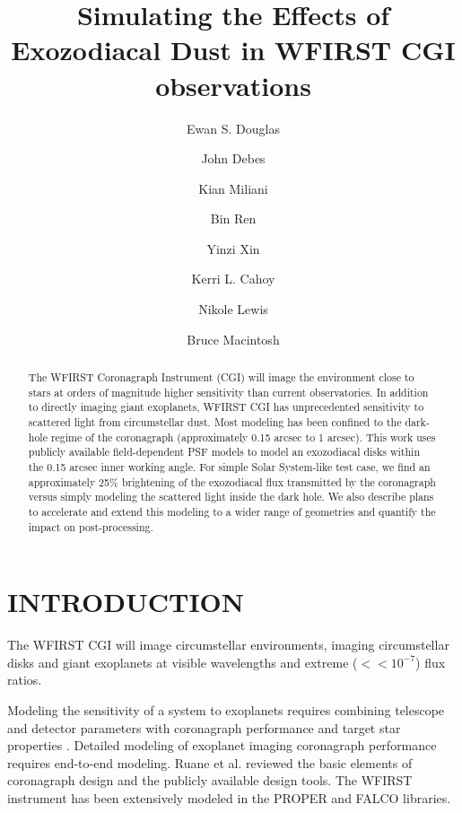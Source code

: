 \documentclass[]{spie}  %
\title{Simulating the Effects of Exozodiacal Dust in WFIRST CGI observations}
\author[a]{Ewan S. Douglas}
\author[b]{John Debes}
\author[a]{Kian Miliani}
\author[b]{Bin Ren}
\author[c]{Yinzi Xin}
\author[c]{Kerri L. Cahoy}
\author[d]{Nikole Lewis}
\author[e]{Bruce Macintosh}
\affil[a]{University of Arizona, Tucson, AZ, USA}
\affil[b]{STScI, Baltimore, MD, USA}
\affil[c]{MIT, Cambridge, MA, USA}
\affil[d]{Cornell University,Ithaca, NY , USA}
\affil[e]{Stanford University, Palo Alto, CA, USA}
\begin{document}
 
\maketitle

\begin{abstract}
The WFIRST Coronagraph Instrument (CGI) will image the environment close to stars at orders of magnitude higher sensitivity than current observatories. In addition to directly imaging giant exoplanets,  WFIRST CGI has unprecedented sensitivity to scattered light from circumstellar dust.
Most modeling has been confined to the dark-hole regime of the coronagraph (approximately 0.15 arcsec to  1 arcsec).
This work uses publicly available field-dependent PSF models to model an exozodiacal disks within the 0.15 arcsec inner working angle. For simple Solar System-like test case, we find an approximately 25\% brightening of the exozodiacal flux transmitted by the coronagraph versus simply modeling the scattered light inside the dark hole. We also describe plans to accelerate and extend this modeling to a wider range of geometries and quantify the impact on post-processing. 

\end{abstract}


\section{INTRODUCTION}\label{sec:intro}  %

The \gls{WFIRST} \gls{CGI}\cite{spergel_wide-field_2015,noecker_coronagraph_2016} will image circumstellar environments, imaging circumstellar disks\cite{schneider_quick_2014,schneider_detection_2016} and giant exoplanets  \cite{marley_quick_2014,ygouf_data_2016-1,bailey_lessons_2018} at visible wavelengths and extreme ($<<10^{-7}$) flux ratios\cite{douglas_wfirst_2018,kasdin_wfirst_2018}.

Modeling the sensitivity of a system to exoplanets requires combining telescope and detector parameters with coronagraph performance and target star properties \cite{nemati_sensitivity_2017,savransky_exosims_2018}.
Detailed modeling of exoplanet imaging coronagraph performance requires end-to-end  modeling. Ruane et al.\cite{ruane_review_2018} reviewed the basic elements of coronagraph design and the publicly available design tools.
The \gls{WFIRST} instrument has been extensively modeled in the PROPER\cite{krist_overview_2015,krist_wfirst_2017,krist_wfirst_2018,zhou_high_2018} and FALCO\cite{riggs_fast_2018,sidick_fast_2018} libraries.
\end{document}
